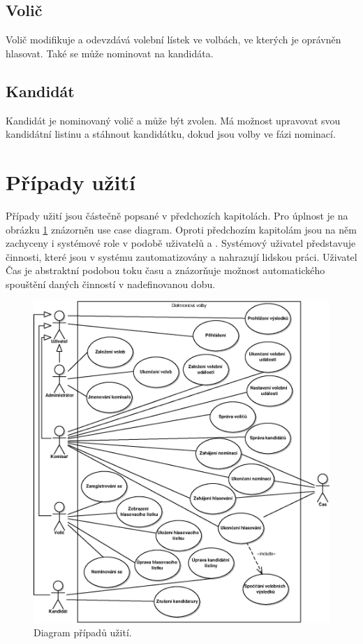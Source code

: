 \documentclass[11pt,twoside,a4paper]{book}
\begin{document}
\subsection{Volič}

Volič modifikuje a odevzdává volební lístek ve volbách, ve kterých je oprávněn hlasovat. Také se může nominovat na kandidáta.


\subsection{Kandidát}

Kandidát je nominovaný volič a může být zvolen. Má možnost upravovat svou kandidátní listinu a stáhnout kandidátku, dokud jsou volby ve fázi nominací.

\section{Případy užití}

Případy užití jsou částečně popsané v předchozích kapitolách. Pro úplnost je na obrázku \ref{fig:pripady_uziti} znázorněn use case diagram. Oproti předchozím kapitolám jsou na něm zachyceny i systémové role v podobě uživatelů  a . Systémový uživatel představuje činnosti, které jsou v systému zautomatizovány a nahrazují lidskou práci. Uživatel Čas je abstraktní podobou toku času a znázorňuje možnost automatického spouštění daných činností v nadefinovanou dobu. 


\begin{figure}[h!]
	\centering
	\includegraphics[scale=0.9]{diagrams/pripady_uziti.eps}
	\caption{Diagram případů užití.}
	\label{fig:pripady_uziti}
\end{figure}
\end{document}
